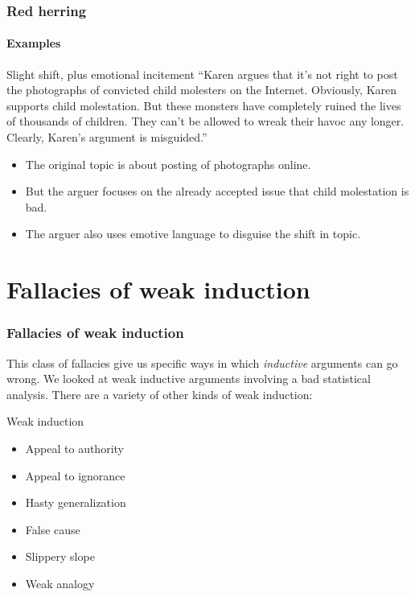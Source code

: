 \documentclass[10pt,letterpaper,xcolor=dvipsnames,handout]{beamer}
\begin{document}
\begin{frame}
  \frametitle{Red herring}
  \framesubtitle{Examples}
  
  \begin{block}{Slight shift, plus emotional incitement}
  ``Karen argues that it's not right to post the photographs of convicted child molesters on the Internet.  Obviously, Karen supports child molestation.  But these monsters have completely ruined the lives of thousands of children.  They can't be allowed to wreak their havoc any longer.  Clearly, Karen's argument is misguided.''
  \end{block}
  
  \begin{itemize}
    \item<2-> The original topic is about posting of photographs online.
    \item<2-> But the arguer focuses on the already accepted issue that child molestation is bad.
    \item<2-> The arguer also uses emotive language to disguise the shift in topic. 
  \end{itemize}
  
\end{frame}

\section{Fallacies of weak induction}

\begin{frame}
  \frametitle{Fallacies of weak induction}
  
  This class of fallacies give us specific ways in which \textit{inductive} arguments can go wrong.  We looked at weak inductive arguments involving a bad statistical analysis.  There are a variety of other kinds of weak induction:
  
  \begin{block}{Weak induction}
    \begin{itemize}
      \item Appeal to authority
      \item Appeal to ignorance
      \item Hasty generalization
      \item False cause
      \item Slippery slope
      \item Weak analogy
    \end{itemize}
  \end{block}
  
\end{frame}
\end{document}
